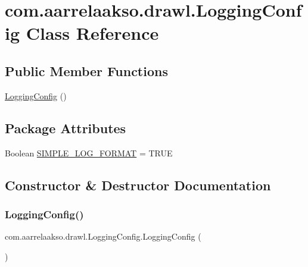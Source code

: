 \hypertarget{classcom_1_1aarrelaakso_1_1drawl_1_1_logging_config}{}\section{com.\+aarrelaakso.\+drawl.\+Logging\+Config Class Reference}
\label{classcom_1_1aarrelaakso_1_1drawl_1_1_logging_config}
\subsection*{Public Member Functions}
\begin{DoxyCompactItemize}
\item 
\hyperlink{classcom_1_1aarrelaakso_1_1drawl_1_1_logging_config_a5f20bbe782ebdc46865c3d38828672f1}{Logging\+Config} ()
\end{DoxyCompactItemize}
\subsection*{Package Attributes}
\begin{DoxyCompactItemize}
\item 
Boolean \hyperlink{classcom_1_1aarrelaakso_1_1drawl_1_1_logging_config_ac397cd9c179f8149cc175b0dc7c34e2d}{S\+I\+M\+P\+L\+E\+\_\+\+L\+O\+G\+\_\+\+F\+O\+R\+M\+AT} = T\+R\+UE
\end{DoxyCompactItemize}


\subsection{Constructor \& Destructor Documentation}
\mbox{\label{classcom_1_1aarrelaakso_1_1drawl_1_1_logging_config_a5f20bbe782ebdc46865c3d38828672f1}} 
\subsubsection{\texorpdfstring{Logging\+Config()}{LoggingConfig()}}
{\footnotesize\ttfamily com.\+aarrelaakso.\+drawl.\+Logging\+Config.\+Logging\+Config (\begin{DoxyParamCaption}{ }\end{DoxyParamCaption})}




